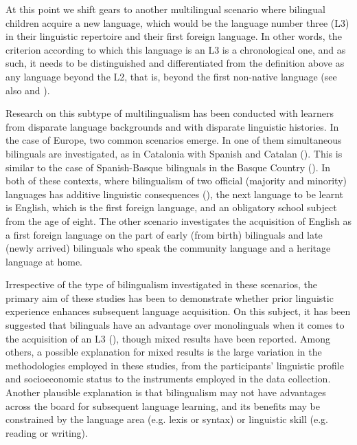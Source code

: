 \documentclass[output=paper]{../langscibook}
\begin{document}
At this point we shift gears to another multilingual scenario where bilingual children acquire a new language, which would be the language number three (L3) in their linguistic repertoire and their first foreign language. In other words, the criterion according to which this language is an L3 is a chronological one, and as such, it needs to be distinguished and differentiated from the definition above as any language beyond the L2, that is, beyond the first non-native language (see also  and ).

Research on this subtype of multilingualism has been conducted with learners from disparate language backgrounds and with disparate linguistic histories. In the case of Europe, two common scenarios emerge. In one of them simultaneous bilinguals are investigated, as in Catalonia with Spanish and Catalan (\citealt{Muñoz2000, Muñoz2000}). This is similar to the case of Spanish-Basque bilinguals in the Basque Country (\citealt{García-MayoGarcía-Lecumberri2003}). In both of these contexts, where bilingualism of two official (majority and minority) languages has additive linguistic consequences (\citealt{CenozValencia1994, Sanz2000}), the next language to be learnt is English, which is the first foreign language, and an obligatory school subject from the age of eight. The other scenario investigates the acquisition of English as a first foreign language on the part of early (from birth) bilinguals and late (newly arrived) bilinguals who speak the community language and a heritage language at home.

Irrespective of the type of bilingualism investigated in these scenarios, the primary aim of these studies has been to demonstrate whether prior linguistic experience enhances subsequent language acquisition. On this subject, it has been suggested that bilinguals have an advantage over monolinguals when it comes to the acquisition of an L3 (\citealt{Sanz2000, Cenoz2003, Cenoz2013, Kopečková2016, HiroshiDegani2018}), though mixed results have been reported. Among others, a possible explanation for mixed results is the large variation in the methodologies employed in these studies, from the participants’ linguistic profile and socioeconomic status to the instruments employed in the data collection. Another plausible explanation is that bilingualism may not have advantages across the board for subsequent language learning, and its benefits may be constrained by the language area (e.g. lexis or syntax) or linguistic skill (e.g. reading or writing).
\end{document}
